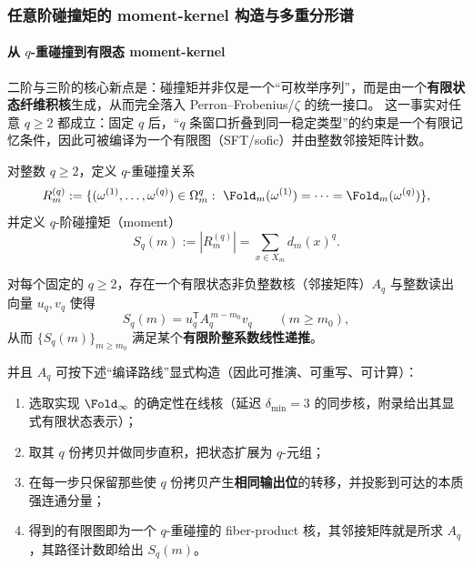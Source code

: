 

\subsubsection{任意阶碰撞矩的 moment-kernel 构造与多重分形谱}\label{subsec:pom-moment-general}

\paragraph{从 \texorpdfstring{$q$}{q}-重碰撞到有限态 moment-kernel}
二阶与三阶的核心新点是：碰撞矩并非仅是一个“可枚举序列”，而是由一个\textbf{有限状态纤维积核}生成，从而完全落入 Perron--Frobenius/\(\zeta\) 的统一接口。
这一事实对任意 \(q\ge 2\) 都成立：固定 \(q\) 后，“\(q\) 条窗口折叠到同一稳定类型”的约束是一个有限记忆条件，因此可被编译为一个有限图（SFT/sofic）并由整数邻接矩阵计数。

\begin{definition}\label{def:pom-moment-q}
对整数 \(q\ge 2\)，定义 \(q\)-重碰撞关系
$$
R_m^{(q)}:=
\{(\omega^{(1)},\dots,\omega^{(q)})\in\Omega_m^q:\ \Fold_m(\omega^{(1)})=\cdots=\Fold_m(\omega^{(q)})\},
$$
并定义 \(q\)-阶碰撞矩（moment）
$$
S_q(m):=|R_m^{(q)}|=\sum_{x\in X_m} d_m(x)^q.
$$
\end{definition}

\begin{proposition}\label{prop:pom-moment-kernel-exists}
对每个固定的 \(q\ge 2\)，存在一个有限状态非负整数核（邻接矩阵）\(A_q\) 与整数读出向量 \(u_q,v_q\) 使得
$$
S_q(m)=u_q^{\mathsf T}A_q^{\,m-m_0}v_q\qquad(m\ge m_0),
$$
从而 \(\{S_q(m)\}_{m\ge m_0}\) 满足某个\textbf{有限阶整系数线性递推}。

并且 \(A_q\) 可按下述“编译路线”显式构造（因此可推演、可重写、可计算）：
\begin{enumerate}
  \item 选取实现 \(\Fold_\infty\) 的确定性在线核（延迟 \(\delta_{\min}=3\) 的同步核，附录给出其显式有限状态表示）；
  \item 取其 \(q\) 份拷贝并做同步直积，把状态扩展为 \(q\)-元组；
  \item 在每一步只保留那些使 \(q\) 份拷贝产生\textbf{相同输出位}的转移，并投影到可达的本质强连通分量；
  \item 得到的有限图即为一个 \(q\)-重碰撞的 fiber-product 核，其邻接矩阵就是所求 \(A_q\)，其路径计数即给出 \(S_q(m)\)。
\end{enumerate}
\end{proposition}

